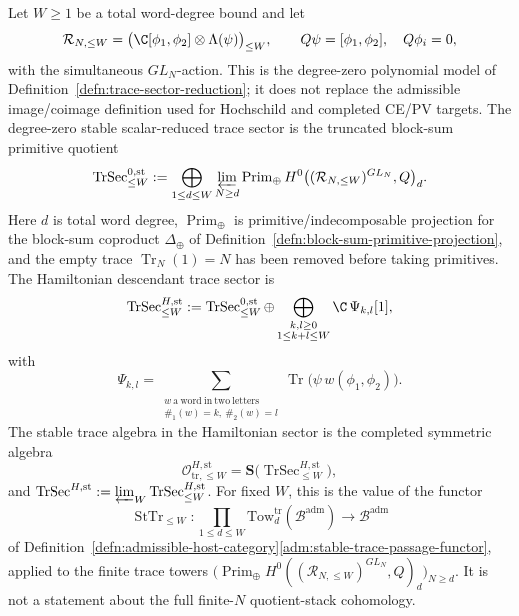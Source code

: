 \documentclass[11pt]{memoir}
\begin{document}
\begin{defn}\label{def:stable-trace-sector-passage}
  Let \(W\geq1\) be a total word-degree bound and let
  \[
    \mathcal R_{N,\leq W}
      =
      \bigl(\C[\phi_1,\phi_2]\otimes\Lambda(\psi)\bigr)_{\leq W},
      \qquad Q\psi=[\phi_1,\phi_2],
      \quad Q\phi_i=0,
  \]
  with the simultaneous \(GL_N\)-action.  This is the degree-zero
  polynomial model of
  Definition~\ref{defn:trace-sector-reduction}; it does not replace
  the admissible image/coimage definition used for Hochschild and
  completed CE/PV targets.  The degree-zero stable scalar-reduced
  trace sector is the truncated block-sum primitive quotient
  \[
    \operatorname{TrSec}^{0,\mathrm{st}}_{\leq W}
      :=
      \bigoplus_{1\leq d\leq W}
      \varprojlim_{N\geq d}
      \operatorname{Prim}_{\oplus}
      H^0\bigl((\mathcal R_{N,\leq W})^{GL_N},Q\bigr)_d .
  \]
  Here \(d\) is total word degree, \(\operatorname{Prim}_{\oplus}\) is
  primitive/indecomposable projection for the block-sum coproduct
  \(\Delta_\oplus\) of
  Definition~\ref{defn:block-sum-primitive-projection}, and the
  empty trace \(\operatorname{Tr}_N(1)=N\) has been removed before taking
  primitives.  The Hamiltonian descendant trace sector is
  \[
    \operatorname{TrSec}^{H,\mathrm{st}}_{\leq W}
      :=
      \operatorname{TrSec}^{0,\mathrm{st}}_{\leq W}
      \oplus
      \bigoplus_{\substack{k,l\geq0\\1\leq k+l\leq W}}
      \C\,\Psi_{k,l}[1],
  \]
  with
  \[
    \Psi_{k,l}
      =
      \sum_{\substack{w\ \mathrm{a\ word\ in\ two\ letters}\\
                      \#_1(w)=k,\ \#_2(w)=l}}
      \operatorname{Tr}\bigl(\psi\,w(\phi_1,\phi_2)\bigr).
  \]
  The stable trace algebra in the Hamiltonian sector is the completed
  symmetric algebra
  \[
    \mathcal O_{\mathrm{tr},\leq W}^{H,\mathrm{st}}
      =
      \mathbf S\bigl(\operatorname{TrSec}^{H,\mathrm{st}}_{\leq W}\bigr),
  \]
  and \(\operatorname{TrSec}^{H,\mathrm{st}}
    :=\varprojlim_W\operatorname{TrSec}^{H,\mathrm{st}}_{\leq W}\).
  For fixed \(W\), this is the value of the functor
  \[
    \operatorname{StTr}_{\le W}\colon
    \prod_{1\le d\le W}
    \mathrm{Tow}^{\mathrm{tr}}_d(\mathcal B^{\mathrm{adm}})
    \longrightarrow
    \mathcal B^{\mathrm{adm}}
  \]
  of
  Definition~\ref{defn:admissible-host-category}\ref{adm:stable-trace-passage-functor},
  applied
  to the finite trace towers
  \(\bigl(\operatorname{Prim}_{\oplus}
  H^0((\mathcal R_{N,\le W})^{GL_N},Q)_d\bigr)_{N\ge d}\).
  It is not a statement about the full finite-\(N\) quotient-stack
  cohomology.
\end{defn}
\end{document}
